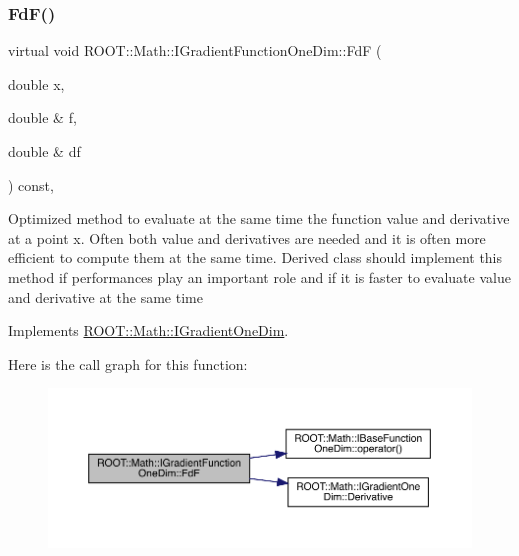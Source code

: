 \subsubsection{\texorpdfstring{FdF()}{FdF()}\hspace{0.1cm}{\footnotesize\ttfamily [1/2]}}
{\footnotesize\ttfamily virtual void R\+O\+O\+T\+::\+Math\+::\+I\+Gradient\+Function\+One\+Dim\+::\+FdF (\begin{DoxyParamCaption}\item[{double}]{x,  }\item[{double \&}]{f,  }\item[{double \&}]{df }\end{DoxyParamCaption}) const\hspace{0.3cm}{\ttfamily [inline]}, {\ttfamily [virtual]}}

Optimized method to evaluate at the same time the function value and derivative at a point x. Often both value and derivatives are needed and it is often more efficient to compute them at the same time. Derived class should implement this method if performances play an important role and if it is faster to evaluate value and derivative at the same time 

Implements \mbox{\hyperlink{classROOT_1_1Math_1_1IGradientOneDim_aef5560ea7d43e64d94bf875713e2a5fc}{R\+O\+O\+T\+::\+Math\+::\+I\+Gradient\+One\+Dim}}.

Here is the call graph for this function\+:
\nopagebreak
\begin{figure}[H]
\begin{center}
\leavevmode
\includegraphics[width=350pt]{d5/d75/classROOT_1_1Math_1_1IGradientFunctionOneDim_a01eaedb2ae1dfa5722f11281acf7a72b_cgraph}
\end{center}
\end{figure}
\mbox{\label{classROOT_1_1Math_1_1IGradientFunctionOneDim_a01eaedb2ae1dfa5722f11281acf7a72b}} 
